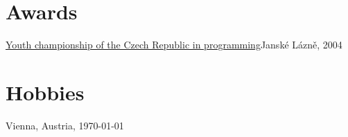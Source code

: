 \documentclass[11pt,a4paper]{moderncv}
\begin{document}
\section{Awards}
    {\href{http://www.stv.cz/pgm_cr/mcr2004vm.html}{Youth championship of the
    Czech Republic in programming}}{Janské Lázně, 2004}{}{}

\section{Hobbies}
\renewcommand{\listitemsymbol}{\Neutral}

\renewcommand{\refname}{Publications, talks}
\makeatletter
\def\mybiblabel#1(#2){\hskip 0pt plus 1filll\relax #2}
\def\@biblabel#1{\mybiblabel #1}
\makeatother
\nocite{*}



\vfill
Vienna, Austria, \today
\end{document}
